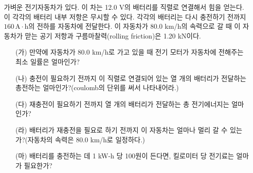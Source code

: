 \documentclass[tightenlines,floatfix,nofootinbib,superscriptaddress,fleqn]{revtex4-2}
\begin{document}
가벼운 전기자동차가 있다. 이 차는 12.0 V의 배터리를 직렬로 연결해서
힘을 얻는다. 이 각각의 배터리 내부 저항은 무시할 수 있다. 각각의
배터리는 다시 충전하기 전까지 $160\,\mathrm{A\cdot h}$의 전하를
자동차에 전달한다. 이 자동차가 80.0 km/h의 속력으로 갈 때 이 자동차가
맏는 공기 저항과 구름마찰력(rolling friction)은 1.20 kN이다. 
\begin{itemize}
\item[(가)] 만약에 자동차가 80.0 km/h로 가고 있을 때 전기 모터가
  자동차에 전해주는 최소 일률은 얼마인가?
\item[(나)] 충전이 필요하기 전까지 이 직렬로 연결되어 있는 열 개의
  배터리가 전달하는 총전하는 얼마인가?(coulomb의 단위를 써서
  나타내어라.) 
\item[(다)] 재충전이 필요하기 전까지 열 개의 배터리가 전달하는 총
  전기에너지는 얼마인가? 
\item[(라)] 배터리가 재충전을 필요로 하기 전까지 이 자동차는 얼마나
  멀리 갈 수 있는가?(자동차의 속력은 80.0 km/h로 일정하다.)
\item[(마)] 배터리를 충전하는 데 1 kW-h 당 100원이 든다면, 킬로미터 당
  전기료는 얼마가 필요한가? 
\end{itemize}

\vspace{1.cm}
\end{document}
